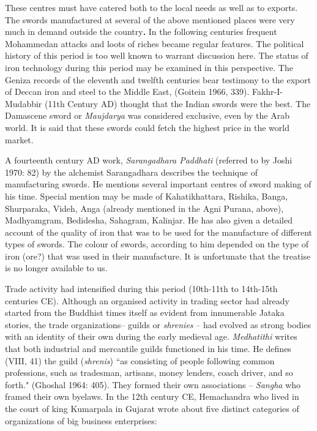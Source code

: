 These centres must have catered both to the local needs as well as to exports. The swords manufactured at several of the above mentioned places were very much in demand outside the country\textbf{. }In the following centuries frequent Mohammedan attacks and loots of riches became regular features. The political history of this period is too well known to warrant discussion here. The status of iron technology during this period may be examined in this perspective. The Geniza records of the eleventh and twelfth centuries bear testimony to the export of Deccan iron and steel to the Middle East, (Goitein 1966, 339). Fakhr-I-Mudabbir (11th Century AD) thought that the Indian swords were the best. The Damascene sword or \textit{Maujdarya} was considered exclusive, even by the Arab world. It is said that these swords could fetch the highest price in the world market.

A fourteenth century AD work, \textit{Sarangadhara Paddhati} (referred to by Joshi 1970: 82) by the alchemist Sarangadhara describes the technique of manufacturing swords\textit{.} He mentions several important centres of sword making of his time. Special mention may be made of Kahatikhattara, Rishika, Banga, Shurparaka, Videh, Anga (already mentioned in the Agni Purana, above), Madhyamgram, Bedidesha, Sahagram, Kalinjar. He has also given a detailed account of the quality of iron that was to be used for the manufacture of different types of swords. The colour of swords, according to him depended on the type of iron (ore?) that was used in their manufacture. It is unfortunate that the treatise is no longer available to us.

Trade activity had intensified during this period (10th-11th to 14th-15th centuries CE). Although an organised activity in trading sector had already started from the Buddhist times itself as evident from innumerable Jataka stories, the trade organizations– guilds or \textit{shrenies} – had evolved as strong bodies with an identity of their own during the early medieval age. \textit{Medhatithi} writes that both industrial and mercantile guilds functioned in his time. He defines (VIII, 41) the guild (\textit{shrenis}) ``as consisting of people following common professions, such as tradesman, artisans, money lenders, coach driver, and so forth." (Ghoshal 1964: 405). They formed their own associations – \textit{Sangha} who framed their own byelaws. In the 12th century CE, Hemachandra who lived in the court of king Kumarpala in Gujarat wrote about five distinct categories of organizations of big business enterprises:

